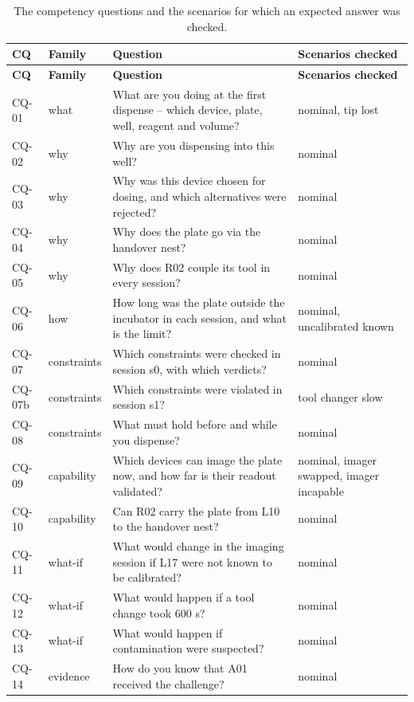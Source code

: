 \documentclass[10pt,a4paper]{article}
\begin{document}
{\footnotesize
\begin{xltabular}{\linewidth}{llXp{3.6cm}}
\caption{The competency questions and the scenarios for which an expected answer was checked.}\label{tab:cqlist}\\
\toprule
\textbf{CQ} & \textbf{Family} & \textbf{Question} & \textbf{Scenarios checked} \\\midrule
\endfirsthead
\toprule
\textbf{CQ} & \textbf{Family} & \textbf{Question} & \textbf{Scenarios checked} \\\midrule
\endhead
\bottomrule
\endlastfoot
CQ-01 & what & What are you doing at the first dispense -- which device, plate, well, reagent and volume? & nominal, tip lost \\
CQ-02 & why & Why are you dispensing into this well? & nominal \\
CQ-03 & why & Why was this device chosen for dosing, and which alternatives were rejected? & nominal \\
CQ-04 & why & Why does the plate go via the handover nest? & nominal \\
CQ-05 & why & Why does R02 couple its tool in every session? & nominal \\
CQ-06 & how & How long was the plate outside the incubator in each session, and what is the limit? & nominal, uncalibrated known \\
CQ-07 & constraints & Which constraints were checked in session s0, with which verdicts? & nominal \\
CQ-07b & constraints & Which constraints were violated in session s1? & tool changer slow \\
CQ-08 & constraints & What must hold before and while you dispense? & nominal \\
CQ-09 & capability & Which devices can image the plate now, and how far is their readout validated? & nominal, imager swapped, imager incapable \\
CQ-10 & capability & Can R02 carry the plate from L10 to the handover nest? & nominal \\
CQ-11 & what-if & What would change in the imaging session if L17 were not known to be calibrated? & nominal \\
CQ-12 & what-if & What would happen if a tool change took 600 s? & nominal \\
CQ-13 & what-if & What would happen if contamination were suspected? & nominal \\
CQ-14 & evidence & How do you know that A01 received the challenge? & nominal \\

\end{xltabular}}
\end{document}
